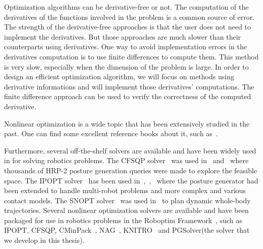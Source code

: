 Optimization algorithms can be derivative-free or not.
The computation of the derivatives of the functions involved in the problem is a common source of error.
The strength of the derivative-free approaches is that the user does not need to implement the derivatives.
But those approaches are much slower than their counterparts using derivatives.
One way to avoid implementation errors in the derivatives computation is to use finite differences to compute them.
This method is very slow, especially when the dimension of the problem is large.
In order to design an efficient optimization algorithm, we will focus on methods using derivative informations and will implement those derivatives' computations.
The finite difference approach can be used to verify the correctness of the computed derivative.

Nonlinear optimization is a wide topic that has been extensively studied in the past.
One can find some excellent reference books about it, such as~\cite{nocedal:book:2006, bonnans:book:2003, boyd2004convex}.

Furthermore, several off-the-shelf solvers are available and have been widely used in for solving robotics problems.
The CFSQP solver~\cite{cfsqp:manual} was used in~\cite{escande:iros:2009} and~\cite{escande:ras:2013} where thousands of HRP-2 posture generation queries were made to explore the feasible space.
The IPOPT solver~\cite{wachter:mathprog:2006} has been used in~\cite{vaillant:humanoids:2014},~\cite{vaillant:autonomousrobots:2016},~\cite{bouyarmane:ar:2012} where the posture generator had been extended to handle multi-robot problems and more complex and various contact models.
The SNOPT solver~\cite{gill2005snopt} was used in~\cite{dai2014whole} to plan dynamic whole-body trajectories.
Several nonlinear optimization solvers are available and have been packaged for use in robotics problems in the Roboptim Framework~\cite{moulard:jsme:2013}, such as IPOPT, CFSQP, CMinPack~\cite{cminpack}, NAG~\cite{nag}, KNITRO~\cite{knitro} and PGSolver(the solver that we develop in this thesis).

